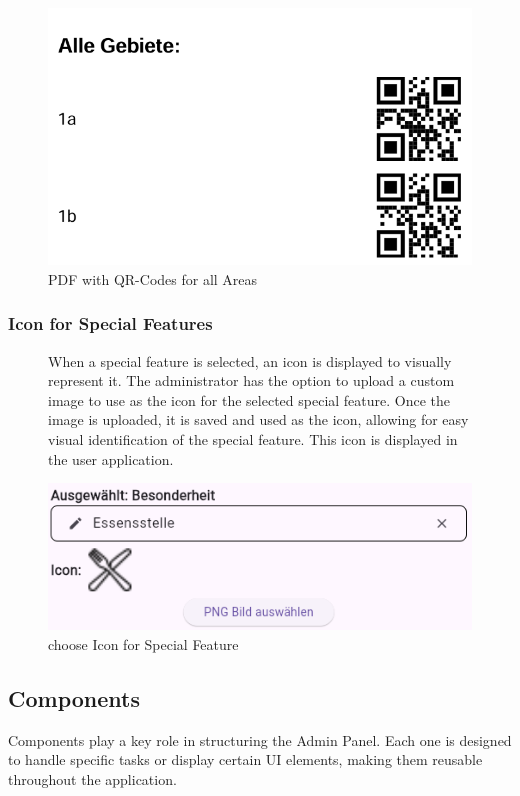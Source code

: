 \begin{figure}[H]
    \centering
    \includegraphics[width=0.4\linewidth]{images/AdminPanel/GebietePDF.png}
    \caption{PDF with QR-Codes for all Areas}
\end{figure}


\subsubsection{Icon for Special Features}
\begin{figure}[H] 
    \begin{minipage}{0.6\textwidth}
        When a special feature is selected, an icon is displayed to visually represent it. The administrator has the option to upload a custom image to use as the icon for the selected special feature. Once the image is uploaded, it is saved and used as the icon, allowing for easy visual identification of the special feature. This icon is displayed in the user application.
    \end{minipage}
    \hfill
    \begin{minipage}{0.35\textwidth}
        \centering
        \includegraphics[width=\linewidth]{images/AdminPanel/chooseIcon.png}
        \caption{choose Icon for Special Feature}
    \end{minipage}
\end{figure}


\subsection{Components}
Components play a key role in structuring the Admin Panel. Each one is designed to handle specific tasks or display certain UI elements, making them reusable throughout the application. 

